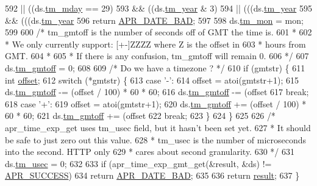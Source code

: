 \begin{DoxyCode}
592         || ((ds.\hyperlink{structapr__time__exp__t_a6c09a274f011841e9e988c3c9504848a}{tm\_mday} == 29)
593         && ((ds.\hyperlink{structapr__time__exp__t_a35c32245be49279a6689e34bcd6e534a}{tm\_year} & 3)
594         || (((ds.\hyperlink{structapr__time__exp__t_a35c32245be49279a6689e34bcd6e534a}{tm\_year} %
595         && (((ds.\hyperlink{structapr__time__exp__t_a35c32245be49279a6689e34bcd6e534a}{tm\_year} %
596         \textcolor{keywordflow}{return} \hyperlink{group__APR__Util__Date_ga8be88b25f4b477ad13c4067c959411b0}{APR\_DATE\_BAD};
597 
598     ds.\hyperlink{structapr__time__exp__t_a746f38956dfeb6be3bd17282791e3577}{tm\_mon} = mon;
599 
600     \textcolor{comment}{/* tm\_gmtoff is the number of seconds off of GMT the time is.}
601 \textcolor{comment}{     *}
602 \textcolor{comment}{     * We only currently support: [+-]ZZZZ where Z is the offset in}
603 \textcolor{comment}{     * hours from GMT.}
604 \textcolor{comment}{     *}
605 \textcolor{comment}{     * If there is any confusion, tm\_gmtoff will remain 0.}
606 \textcolor{comment}{     */}
607     ds.\hyperlink{structapr__time__exp__t_a1102ca16ed70b1c707473431eed58d7b}{tm\_gmtoff} = 0;
608 
609     \textcolor{comment}{/* Do we have a timezone ? */}
610     \textcolor{keywordflow}{if} (gmtstr) \{
611         \textcolor{keywordtype}{int} \hyperlink{group__APACHE__CORE__PROTO_ga0feae9f93d4bc5dca392194c513e0921}{offset};
612         \textcolor{keywordflow}{switch} (*gmtstr) \{
613         \textcolor{keywordflow}{case} \textcolor{charliteral}{'-'}:
614             offset = atoi(gmtstr+1);
615             ds.\hyperlink{structapr__time__exp__t_a1102ca16ed70b1c707473431eed58d7b}{tm\_gmtoff} -= (offset / 100) * 60 * 60;
616             ds.\hyperlink{structapr__time__exp__t_a1102ca16ed70b1c707473431eed58d7b}{tm\_gmtoff} -= (offset %
617             \textcolor{keywordflow}{break};
618         \textcolor{keywordflow}{case} \textcolor{charliteral}{'+'}:
619             offset = atoi(gmtstr+1);
620             ds.\hyperlink{structapr__time__exp__t_a1102ca16ed70b1c707473431eed58d7b}{tm\_gmtoff} += (offset / 100) * 60 * 60;
621             ds.\hyperlink{structapr__time__exp__t_a1102ca16ed70b1c707473431eed58d7b}{tm\_gmtoff} += (offset %
622             \textcolor{keywordflow}{break};
623         \}
624     \}
625 
626     \textcolor{comment}{/* apr\_time\_exp\_get uses tm\_usec field, but it hasn't been set yet. }
627 \textcolor{comment}{     * It should be safe to just zero out this value.}
628 \textcolor{comment}{     * tm\_usec is the number of microseconds into the second.  HTTP only}
629 \textcolor{comment}{     * cares about second granularity.}
630 \textcolor{comment}{     */}
631     ds.\hyperlink{structapr__time__exp__t_ac5f11e3c1f5a30d357df2108296a8d30}{tm\_usec} = 0;
632 
633     \textcolor{keywordflow}{if} (apr\_time\_exp\_gmt\_get(&result, &ds) != \hyperlink{group__apr__errno_ga9ee311b7bf1c691dc521d721339ee2a6}{APR\_SUCCESS}) 
634         \textcolor{keywordflow}{return} \hyperlink{group__APR__Util__Date_ga8be88b25f4b477ad13c4067c959411b0}{APR\_DATE\_BAD};
635     
636     \textcolor{keywordflow}{return} \hyperlink{group__APACHE__CORE__MPM_ga9f5959dd76d5c83e775dcf44de684686}{result};
637 \}
\end{DoxyCode}


